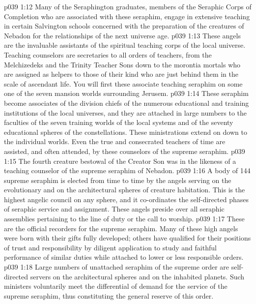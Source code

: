 \vs p039 1:12 Many of the Seraphington graduates, members of the Seraphic Corps of Completion who are associated with these seraphim, engage in extensive teaching in certain Salvington schools concerned with the preparation of the creatures of Nebadon for the relationships of the next universe age.
\pc \vs p039 1:13 \bibnobreakspace {} These angels are the invaluable assistants of the spiritual teaching corps of the local universe. Teaching counselors are secretaries to all orders of teachers, from the Melchizedeks and the Trinity Teacher Sons down to the morontia mortals who are assigned as helpers to those of their kind who are just behind them in the scale of ascendant life. You will first  these associate teaching seraphim on some one of the seven mansion worlds surrounding Jerusem.
\vs p039 1:14 These seraphim become associates of the division chiefs of the numerous educational and training institutions of the local universes, and they are attached in large numbers to the faculties of the seven training worlds of the local systems and of the seventy educational spheres of the constellations. These ministrations extend on down to the individual worlds. Even the true and consecrated teachers of time are assisted, and often attended, by these counselors of the supreme seraphim.
\vs p039 1:15 The fourth creature bestowal of the Creator Son was in the likeness of a teaching counselor of the supreme seraphim of Nebadon.
\pc \vs p039 1:16 \bibnobreakspace {} A body of 144 supreme seraphim is elected from time to time by the angels serving on the evolutionary and on the architectural spheres of creature habitation. This is the highest angelic council on any sphere, and it co\hyp{}ordinates the self\hyp{}directed phases of seraphic service and assignment. These angels preside over all seraphic assemblies pertaining to the line of duty or the call to worship.
\pc \vs p039 1:17 \bibnobreakspace {} These are the official recorders for the supreme seraphim. Many of these high angels were born with their gifts fully developed; others have qualified for their positions of trust and responsibility by diligent application to study and faithful performance of similar duties while attached to lower or less responsible orders.
\pc \vs p039 1:18 \bibnobreakspace {} Large numbers of unattached seraphim of the supreme order are self\hyp{}directed servers on the architectural spheres and on the inhabited planets. Such ministers voluntarily meet the differential of demand for the service of the supreme seraphim, thus constituting the general reserve of this order.
